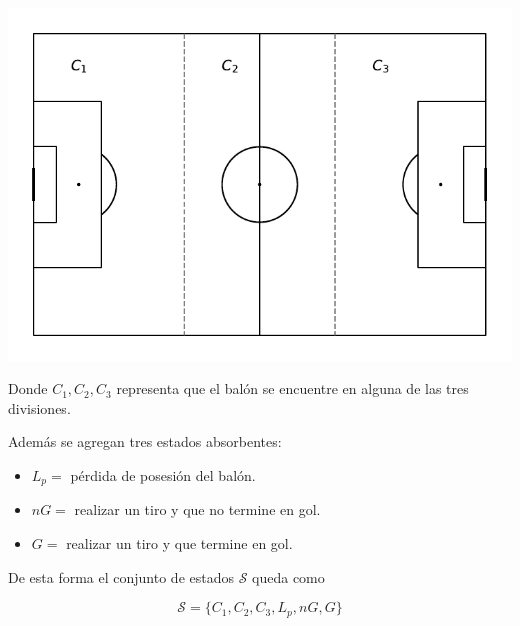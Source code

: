\documentclass[
  us-letterpaper,
  DIV=11,
  numbers=noendperiod]{scrreprt}
\providecommand{\tightlist}{%
  \setlength{\itemsep}{0pt}\setlength{\parskip}{0pt}}\usepackage{longtable,booktabs,array}
\begin{document}
\includegraphics{formulacion_files/figure-pdf/cell-2-output-1.pdf}

Donde \(C_1,C_2,C_3\) representa que el balón se encuentre en alguna de
las tres divisiones.

Además se agregan tres estados absorbentes:

\begin{itemize}
\tightlist
\item
  \(L_p =\) pérdida de posesión del balón.
\item
  \(nG =\) realizar un tiro y que no termine en gol.
\item
  \(G =\) realizar un tiro y que termine en gol.
\end{itemize}

De esta forma el conjunto de estados \(\mathcal{S}\) queda como

\[
    \mathcal{S}=\{C_1,C_2,C_3,L_p,nG,G\}
\]
\end{document}
